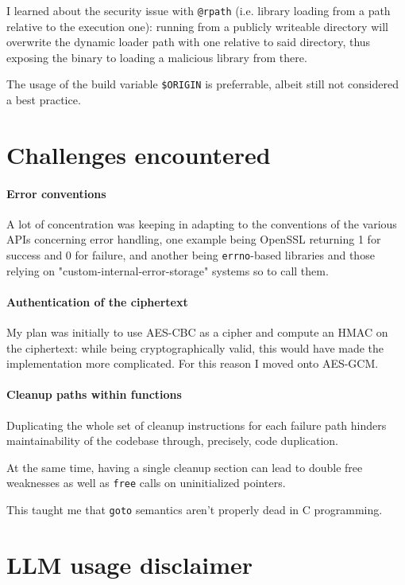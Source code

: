 I learned about the security issue with \texttt{@rpath} (i.e. library loading from
a path relative to the execution one): running from a publicly writeable directory
will overwrite the dynamic loader path with one relative to said directory, thus
exposing the binary to loading a malicious library from there.

The usage of the build variable \texttt{\$ORIGIN} is preferrable, albeit still
not considered a best practice\cite{stackexchange-rpath-security}.

\section{Challenges encountered}

\paragraph{Error conventions}
A lot of concentration was keeping in adapting to the conventions of the various APIs
concerning error handling, one example being OpenSSL returning 1 for success and 0 for
failure, and another being \texttt{errno}-based libraries and those relying on
"custom-internal-error-storage" systems so to call them.

\paragraph{Authentication of the ciphertext}

My plan was initially to use AES-CBC as a cipher and compute an HMAC on the
ciphertext: while being cryptographically valid, this would have made the
implementation more complicated. For this reason I moved onto AES-GCM.

\paragraph{Cleanup paths within functions}

Duplicating the whole set of cleanup instructions for each failure path hinders
maintainability of the codebase through, precisely, code duplication.

At the same time, having a single cleanup section can lead to double free weaknesses
as well as \texttt{free} calls on uninitialized pointers.

This taught me that \texttt{goto} semantics aren't properly dead in C programming.

\section{LLM usage disclaimer}

